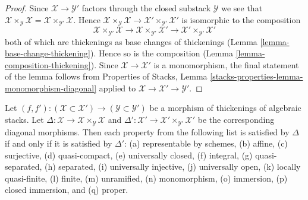 \begin{proof}
Since $\mathcal{X} \to \mathcal{Y}'$ factors through the closed
substack $\mathcal{Y}$ we see that
$\mathcal{X} \times_\mathcal{Y} \mathcal{X} =
\mathcal{X} \times_{\mathcal{Y}'} \mathcal{X}$.
Hence
$\mathcal{X} \times_\mathcal{Y} \mathcal{X} \to
\mathcal{X}' \times_{\mathcal{Y}'} \mathcal{X}'$
is isomorphic to the composition
$$
\mathcal{X} \times_{\mathcal{Y}'} \mathcal{X} \to
\mathcal{X} \times_{\mathcal{Y}'} \mathcal{X}' \to
\mathcal{X}' \times_{\mathcal{Y}'} \mathcal{X}'
$$
both of which are thickenings as base changes of thickenings
(Lemma \ref{lemma-base-change-thickening}).
Hence so is the composition
(Lemma \ref{lemma-composition-thickening}).
Since $\mathcal{X} \to \mathcal{X}'$ is a monomorphism,
the final statement of the lemma follows from
Properties of Stacks, Lemma
\ref{stacks-properties-lemma-monomorphism-diagonal}
applied to $\mathcal{X} \to \mathcal{X}' \to \mathcal{Y}'$.
\end{proof}

\begin{lemma}
\label{lemma-thickening-diagonals}
Let $(f, f') : (\mathcal{X} \subset \mathcal{X}') \to
(\mathcal{Y} \subset \mathcal{Y}')$ be a morphism of thickenings
of algebraic stacks.
Let $\Delta : \mathcal{X} \to \mathcal{X} \times_\mathcal{Y} \mathcal{X}$ and
$\Delta' : \mathcal{X}' \to \mathcal{X}' \times_{\mathcal{Y}'} \mathcal{X}'$
be the corresponding diagonal morphisms.
Then each property from the following list is satisfied by $\Delta$ if
and only if it is satisfied by $\Delta'$:
(a) representable by schemes, (b) affine, (c) surjective, (d) quasi-compact,
(e) universally closed, (f) integral, (g) quasi-separated, (h) separated,
(i) universally injective, (j) universally open, (k) locally quasi-finite,
(l) finite, (m) unramified, (n) monomorphism, (o) immersion,
(p) closed immersion, and (q) proper.
\end{lemma}

